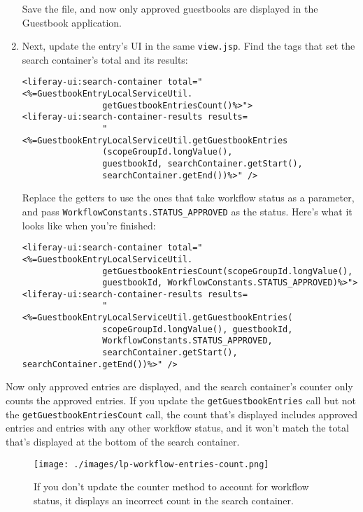 \begin{enumerate}
  Save the file, and now only approved guestbooks are displayed in the
  Guestbook application.
\item
  Next, update the entry's UI in the same \texttt{view.jsp}. Find the
  tags that set the search container's total and its results:

\begin{verbatim}
<liferay-ui:search-container total="<%=GuestbookEntryLocalServiceUtil.
                getGuestbookEntriesCount()%>">
<liferay-ui:search-container-results results=
                "<%=GuestbookEntryLocalServiceUtil.getGuestbookEntries
                (scopeGroupId.longValue(),
                guestbookId, searchContainer.getStart(),
                searchContainer.getEnd())%>" />
\end{verbatim}

  Replace the getters to use the ones that take workflow status as a
  parameter, and pass \texttt{WorkflowConstants.STATUS\_APPROVED} as the
  status. Here's what it looks like when you're finished:

\begin{verbatim}
<liferay-ui:search-container total="<%=GuestbookEntryLocalServiceUtil.
                getGuestbookEntriesCount(scopeGroupId.longValue(), 
                guestbookId, WorkflowConstants.STATUS_APPROVED)%>">
<liferay-ui:search-container-results results=
                "<%=GuestbookEntryLocalServiceUtil.getGuestbookEntries(
                scopeGroupId.longValue(), guestbookId, 
                WorkflowConstants.STATUS_APPROVED, 
                searchContainer.getStart(), searchContainer.getEnd())%>" />
\end{verbatim}
\end{enumerate}

Now only approved entries are displayed, and the search container's
counter only counts the approved entries. If you update the
\texttt{getGuestbookEntries} call but not the
\texttt{getGuestbookEntriesCount} call, the count that's displayed
includes approved entries and entries with any other workflow status,
and it won't match the total that's displayed at the bottom of the
search container.

\begin{figure}
\centering
\texttt{[image: ./images/lp-workflow-entries-count.png]}
\caption{If you don't update the counter method to account for workflow
status, it displays an incorrect count in the search container.}
\end{figure}

